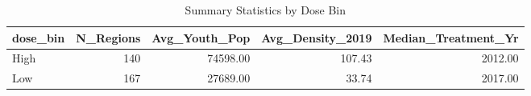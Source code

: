 \begin{table}[ht]
\centering
\begin{tabular}{lrrrr}
  \toprule
dose\_bin & N\_Regions & Avg\_Youth\_Pop & Avg\_Density\_2019 & Median\_Treatment\_Yr \\ 
  \midrule
High & 140 & 74598.00 & 107.43 & 2012.00 \\ 
  Low & 167 & 27689.00 & 33.74 & 2017.00 \\ 
   \bottomrule
\end{tabular}
\caption{Summary Statistics by Dose Bin} 
\label{tab:bin_summary}
\end{table}
